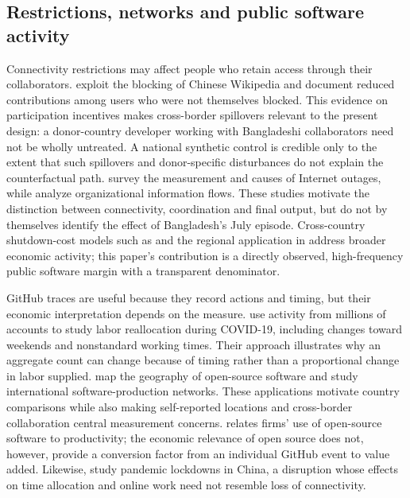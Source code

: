 \subsection{Restrictions, networks and public software activity}

Connectivity restrictions may affect people who retain access through their collaborators. \citet{zhang2011} exploit the blocking of Chinese Wikipedia and document reduced contributions among users who were not themselves blocked. This evidence on participation incentives makes cross-border spillovers relevant to the present design: a donor-country developer working with Bangladeshi collaborators need not be wholly untreated. A national synthetic control is credible only to the extent that such spillovers and donor-specific disturbances do not explain the counterfactual path. \citet{aceto2018} survey the measurement and causes of Internet outages, while \citet{schachenhofer2023} analyze organizational information flows. These studies motivate the distinction between connectivity, coordination and final output, but do not by themselves identify the effect of Bangladesh's July episode. Cross-country shutdown-cost models such as \citet*{tagat2024} and the regional application in \citet{gunsilius2023} address broader economic activity; this paper's contribution is a directly observed, high-frequency public software margin with a transparent denominator.

GitHub traces are useful because they record actions and timing, but their economic interpretation depends on the measure. \citet{mcdermott2021} use activity from millions of accounts to study labor reallocation during COVID-19, including changes toward weekends and nonstandard working times. Their approach illustrates why an aggregate count can change because of timing rather than a proportional change in labor supplied. \citet{wachs2022} map the geography of open-source software and \citet{birkholz2026} study international software-production networks. These applications motivate country comparisons while also making self-reported locations and cross-border collaboration central measurement concerns. \citet{nagle2019} relates firms' use of open-source software to productivity; the economic relevance of open source does not, however, provide a conversion factor from an individual GitHub event to value added. Likewise, \citet{hu2023} study pandemic lockdowns in China, a disruption whose effects on time allocation and online work need not resemble loss of connectivity.


